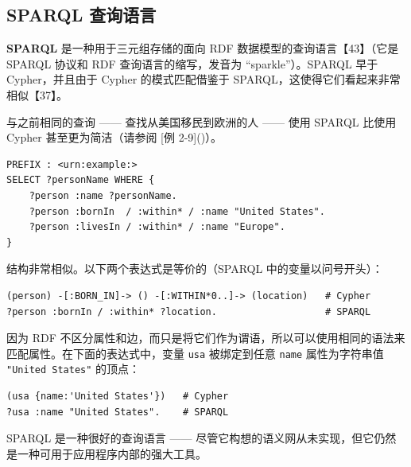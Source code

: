 \subsection{SPARQL 查询语言}

\textbf{SPARQL} 是一种用于三元组存储的面向 RDF 数据模型的查询语言【43】（它是 SPARQL 协议和 RDF 查询语言的缩写，发音为 “sparkle”）。SPARQL 早于 Cypher，并且由于 Cypher 的模式匹配借鉴于 SPARQL，这使得它们看起来非常相似【37】。

与之前相同的查询 —— 查找从美国移民到欧洲的人 —— 使用 SPARQL 比使用 Cypher 甚至更为简洁（请参阅 [例 2-9]()）。

\label{exam:example2-9}
\begin{lstlisting}[caption={与示例 2-4 相同的查询，用 SPARQL 表示}]
PREFIX : <urn:example:>
SELECT ?personName WHERE {
    ?person :name ?personName.
    ?person :bornIn  / :within* / :name "United States".
    ?person :livesIn / :within* / :name "Europe".
}
\end{lstlisting}

结构非常相似。以下两个表达式是等价的（SPARQL 中的变量以问号开头）：

\begin{lstlisting}
(person) -[:BORN_IN]-> () -[:WITHIN*0..]-> (location)   # Cypher
?person :bornIn / :within* ?location.                   # SPARQL
\end{lstlisting}

因为 RDF 不区分属性和边，而只是将它们作为谓语，所以可以使用相同的语法来匹配属性。在下面的表达式中，变量 \texttt{usa} 被绑定到任意 \texttt{name} 属性为字符串值 \texttt{"United States"} 的顶点：

\begin{lstlisting}
(usa {name:'United States'})   # Cypher
?usa :name "United States".    # SPARQL
\end{lstlisting}

SPARQL 是一种很好的查询语言 —— 尽管它构想的语义网从未实现，但它仍然是一种可用于应用程序内部的强大工具。

